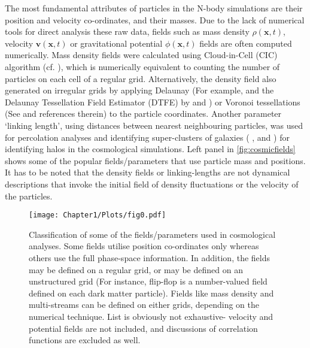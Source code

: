 The most fundamental attributes of particles in the N-body simulations are their position and velocity co-ordinates, and their masses. Due to the lack of numerical tools for direct analysis these raw data, fields such as mass density $\rho(\mathbf{x}, t)$, velocity $\mathbf{v}(\mathbf{x}, t)$ or gravitational potential $\phi(\mathbf{x}, t)$ fields are often computed numerically. Mass density fields were calculated using Cloud-in-Cell (CIC) algorithm (cf. \citealt{Hockney1988}), which is numerically equivalent to counting the number of particles on each cell of a regular grid. Alternatively, the density field also generated on irregular grids by applying Delaunay (For example, \citealt{Icke1991} and the Delaunay Tessellation Field Estimator (DTFE) by \citealt{Schaap2000} and \citealt{Weygaert2009a}) or Voronoi tessellations (See \citealt{Schaap2000} and references therein) to the particle coordinates. Another parameter `linking length', using distances between nearest neighbouring particles, was used for percolation analyses and identifying super-clusters of galaxies ( \citealt{Zeldovich1982}, \citealt{Shandarin1983} and \citealt{Shandarin1983b}) for identifying halos \citealt{Davis1985} in the cosmological simulations. Left panel in \autoref{fig:cosmicfields} shows some of the popular fields/parameters that use particle mass and positions. It has to be noted that the density fields or linking-lengths are not dynamical descriptions that invoke the initial field of density fluctuations or the velocity of the particles. 


\begin{figure*}
\begin{minipage}[t]{0.99\linewidth}
 \centering\texttt{[image: Chapter1/Plots/fig0.pdf]} 
\end{minipage}\hfill
{}
\caption{Classification of some of the fields/parameters used in cosmological analyses. Some fields utilise position co-ordinates only whereas others use the full phase-space information. In addition, the fields may be defined on a regular grid, or may be defined on an unstructured grid (For instance, flip-flop is a number-valued field defined on each dark matter particle). Fields like mass density and multi-streams can be defined on either grids, depending on the numerical technique. List is obviously not exhaustive- velocity and potential fields are not included, and discussions of correlation functions are excluded as well.}
\label{fig:cosmicfields}
\end{figure*}


